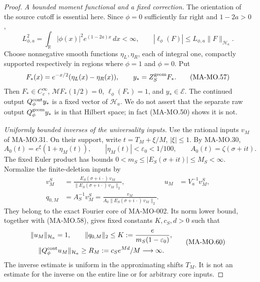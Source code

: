 \begin{proof}
\emph{A bounded moment functional and a fixed correction.}
The orientation of the source cutoff is essential here. Since
\(\phi=0\) sufficiently far right and \(1-2a>0\),
\[
 L_{\phi,a}^2=\int_{\mathbb R}|\phi(x)|^2e^{(1-2a)x}\,dx<\infty,
 \qquad |\ell_\phi(F)|\le L_{\phi,a}\|F\|_{\mathcal H_a}.
 \tag{MA-MO.56}
\]
Choose nonnegative smooth functions \(\eta_L,\eta_R\), each
of integral one, compactly supported respectively in regions
where \(\phi=1\) and \(\phi=0\). Put
\[
 F_*(x)=e^{-x/2}(\eta_L(x)-\eta_R(x)),\qquad
 y_*=Z_S^{\rm geom}F_*.
 \tag{MA-MO.57}
\]
Then \(F_*\in C_c^\infty\), \(\mathcal MF_*(1/2)=0\),
\(\ell_\phi(F_*)=1\), and \(y_*\in\mathcal E\).
The continued output \(Q_\phi^{\rm cont}y_*\) is a fixed
vector of \(\mathcal H_a\). We do not assert that the
separate raw output \(Q_\phi^{\rm geom}y_*\) is in that
Hilbert space; in fact (MA-MO.50) shows it is not.

\emph{Uniformly bounded inverses of the universality inputs.}
Use the rational inputs \(v_M\) of MA-MO.31. On their support,
write \(t=T_M+\xi/M\), \(|\xi|\le1\). By MA-MO.30,
\[
 A_0(t)=e^\xi(1+\eta_M(t)),\qquad
      |\eta_M(t)|<\varepsilon_0<1/100,
      \qquad A_0(t)=\zeta(\sigma+it).
 \tag{MA-MO.58}
\]
The fixed Euler product has bounds
\(0<m_S\le|E_S(\sigma+it)|\le M_S<\infty\).
Normalize the finite-deletion inputs by
\[
 \begin{aligned}
 v_M^S&=\frac{E_S(\sigma+i\,\cdot)\,v_M}
                    {\|E_S(\sigma+i\,\cdot)\,v_M\|_2},
 &u_M&=V_a^{-1}v_M^S,\\
 q_{0,M}&=A_S^{-1}v_M^S
   =\frac{v_M}{A_0\|E_S(\sigma+i\,\cdot)\,v_M\|_2}.
 \end{aligned}
 \tag{MA-MO.59}
\]
They belong to the exact Fourier core of MA-MO-002. Its
norm lower bound, together with (MA-MO.58), gives fixed
constants \(K,c_S,d>0\) such that
\[
 \begin{gathered}
 \|u_M\|_{\mathcal H_a}=1,\qquad
 \|q_{0,M}\|_2\le K:=\frac{e}{m_S(1-\varepsilon_0)},\\
 \|Q_\phi^{\rm cont}u_M\|_{\mathcal H_a}
             \ge R_M:=c_Se^{Md}/M\longrightarrow\infty.
 \end{gathered}
 \tag{MA-MO.60}
\]
The inverse estimate is uniform in the approximating shifts
\(T_M\). It is not an estimate for the inverse on the entire
line or for arbitrary core inputs.


\end{proof}
